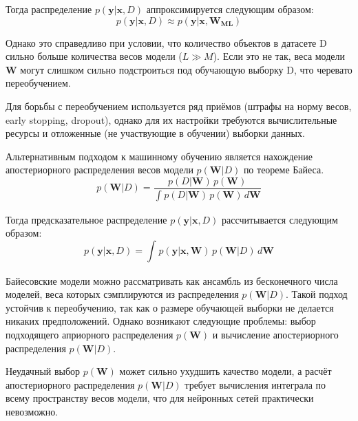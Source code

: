 \documentclass{article}
\numberwithin{equation}{section}
\begin{document}
    Тогда распределение $p(\pmb{y} | \pmb{x}, D)$ аппроксимируется следующим образом:
    \begin{equation}
        p(\pmb{y} | \pmb{x}, D) \approx p(\pmb{y} | \pmb{x}, \pmb{W_{ML}})
    \end{equation}

    Однако это справедливо при условии, что количество объектов в датасете D
    сильно больше количества весов модели ($L \gg M$).
    Если это не так, веса модели $\pmb{W}$ могут слишком сильно подстроиться
    под обучающую выборку D, что черевато переобучением.

    Для борьбы с переобучением используется ряд приёмов (штрафы на норму весов, early stopping, dropout),
    однако для их настройки требуются вычислительные ресурсы и отложенные
    (не участвующие в обучении) выборки данных.

    Альтернативным подходом к машинному обучению является нахождение апостериорного распределения весов модели $p(\pmb{W}| D)$ по теореме Байеса.
    \begin{equation}
        p(\pmb{W}| D)
        =
        \frac
            {
                p(D | \pmb{W})
                \,
                p(\pmb{W})
            }
            {
                \int_{}{
                    p(D | \pmb{W})
                    \,
                    p(\pmb{W})
                    \,
                    d\pmb{W}
                }
            }
    \end{equation}

    Тогда предсказательное распределение $p(\pmb{y} | \pmb{x}, D)$ рассчитывается следующим образом:
    \begin{equation}
        p(\pmb{y} | \pmb{x}, D)
        =
        \int_{}{
            p(\pmb{y} | \pmb{x}, \pmb{W})
            \,
            p(\pmb{W} | D)
            \,
            d\pmb{W}
        }
    \end{equation}

    Байесовские модели можно рассматривать как ансамбль из бесконечного числа моделей,
    веса которых сэмплируются из распределения
    $p(\pmb{W}| D)$.
    Такой подход устойчив к переобучению, так как о размере обучающей выборки не делается никаких предположений.
    Однако возникают следующие проблемы: выбор подходящего априорного распределения
    $p(\pmb{W})$
    и вычисление апостериорного распределения
    $p(\pmb{W}| D)$.

    Неудачный выбор $p(\pmb{W})$ может сильно ухудшить качество модели,
    а расчёт апостериорного распределения $p(\pmb{W}| D)$
    требует вычисления интеграла по всему пространству весов модели,
    что для нейронных сетей практически невозможно.
\end{document}

